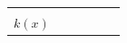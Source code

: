 {\begin{tabular}[t]{|l|l|l|l|l|l|}
         &
         &
         &
     \tabularnewline\cline{1-1}\cline{2-2}\cline{3-3}\cline{4-4}\cline{5-5}\cline{6-6}
                  $k\left(x\right)$
                 &
         &
         &
         &
         &
     \tabularnewline\cline{1-1}\cline{2-2}\cline{3-3}\cline{4-4}\cline{5-5}\cline{6-6}
    \end{tabular}} %
